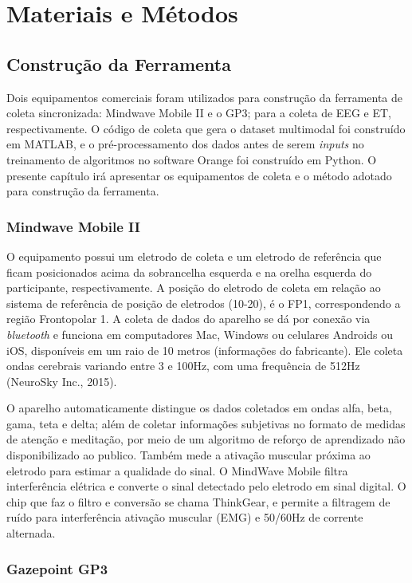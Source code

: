 \chapter{Materiais e Métodos}

\section{Construção da Ferramenta}


Dois equipamentos comerciais foram utilizados para construção da ferramenta de coleta sincronizada: Mindwave Mobile II e o
GP3; para a coleta de EEG e ET, respectivamente. O código de coleta que gera o dataset
multimodal foi construído em MATLAB, e o pré-processamento dos dados antes de serem \textit{inputs} no treinamento
de algoritmos no software Orange foi construído em Python. O presente capítulo irá apresentar os equipamentos de coleta
e o método adotado para construção da ferramenta. 

\subsection{Mindwave Mobile II}
O equipamento possui um eletrodo de coleta e um eletrodo de referência que ficam posicionados 
acima da sobrancelha esquerda e na orelha esquerda do participante, respectivamente. 
A posição do eletrodo de coleta em relação ao sistema de referência de posição de eletrodos (10-20), é o FP1, 
correspondendo a região Frontopolar 1. A coleta de dados do aparelho se dá por conexão via \textit{bluetooth} e 
funciona em computadores Mac, Windows ou celulares Androids ou iOS, disponíveis em um raio de 10 metros (informações do fabricante). 
Ele coleta ondas cerebrais variando entre 3 e 100Hz, com uma frequência de 512Hz (NeuroSky Inc., 2015). 

O aparelho automaticamente distingue os dados coletados em ondas alfa, beta, gama, teta e delta; 
além de coletar informações subjetivas no formato de medidas de atenção e meditação, 
por meio de um algoritmo de reforço de aprendizado não disponibilizado ao publico. 
Também mede a ativação muscular próxima ao eletrodo para estimar a qualidade do sinal. 
O MindWave Mobile filtra interferência elétrica e converte o sinal detectado pelo eletrodo em sinal digital. 
O chip que faz o filtro e conversão se chama ThinkGear, e permite a filtragem de ruído para interferência ativação muscular (EMG) e 50/60Hz de corrente alternada. 

\subsection{Gazepoint GP3}

